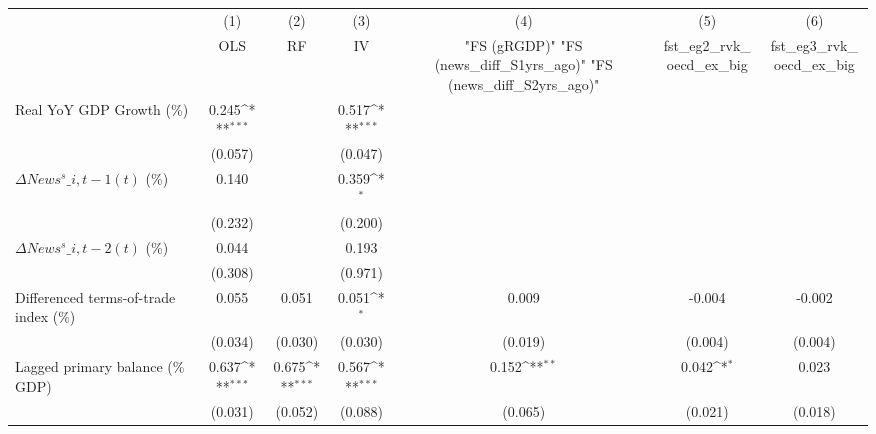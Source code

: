 {
\def\sym#1{\ifmmode^{#1}\else\(^{#1}\)\fi}
\begin{tabular}{l*{6}{c}}
\toprule
                    &\multicolumn{1}{c}{(1)}&\multicolumn{1}{c}{(2)}&\multicolumn{1}{c}{(3)}&\multicolumn{1}{c}{(4)}&\multicolumn{1}{c}{(5)}&\multicolumn{1}{c}{(6)}\\
                    &\multicolumn{1}{c}{OLS}&\multicolumn{1}{c}{RF}&\multicolumn{1}{c}{IV}&\multicolumn{1}{c}{ "FS (gRGDP)"  "FS (news\_diff\_S1yrs\_ago)"  "FS (news\_diff\_S2yrs\_ago)" }&\multicolumn{1}{c}{fst\_eg2\_rvk\_oecd\_ex\_big}&\multicolumn{1}{c}{fst\_eg3\_rvk\_oecd\_ex\_big}\\
\midrule
Real YoY GDP Growth (\%)&       0.245\sym{***}&                     &       0.517\sym{***}&                     &                     &                     \\
                    &     (0.057)         &                     &     (0.047)         &                     &                     &                     \\
\addlinespace
$ \Delta News^s\_{i,t-1}(t)$ (\%)&       0.140         &                     &       0.359\sym{*}  &                     &                     &                     \\
                    &     (0.232)         &                     &     (0.200)         &                     &                     &                     \\
\addlinespace
$ \Delta News^s\_{i,t-2}(t)$ (\%)&       0.044         &                     &       0.193         &                     &                     &                     \\
                    &     (0.308)         &                     &     (0.971)         &                     &                     &                     \\
\addlinespace
Differenced terms-of-trade index (\%)&       0.055         &       0.051         &       0.051\sym{*}  &       0.009         &      -0.004         &      -0.002         \\
                    &     (0.034)         &     (0.030)         &     (0.030)         &     (0.019)         &     (0.004)         &     (0.004)         \\
\addlinespace
Lagged primary balance (\% GDP)&       0.637\sym{***}&       0.675\sym{***}&       0.567\sym{***}&       0.152\sym{**} &       0.042\sym{*}  &       0.023         \\
                    &     (0.031)         &     (0.052)         &     (0.088)         &     (0.065)         &     (0.021)         &     (0.018)         \\

\end{tabular}}
